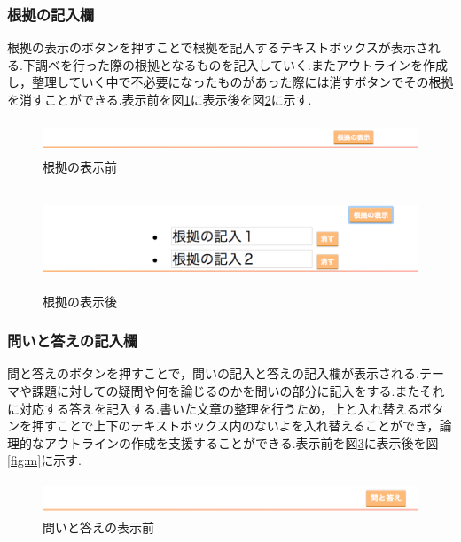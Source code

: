 \documentclass[a4j,12pt]{jarticle}
\begin{document}
\newpage
\subsubsection{根拠の記入欄}
根拠の表示のボタンを押すことで根拠を記入するテキストボックスが表示される.下調べを行った際の根拠となるものを記入していく.またアウトラインを作成し，整理していく中で不必要になったものがあった際には消すボタンでその根拠を消すことができる.表示前を図\ref{fig:j}に表示後を図\ref{fig:k}に示す.
\begin{figure}[h]
\begin{center}
 \includegraphics[clip,width=150mm,height=10mm]{figure/02konkyo.png}
\end{center}
 \caption{根拠の表示前}
 \label{fig:j}
\end{figure}

\begin{figure}[h]
\begin{center}
 \includegraphics[clip,width=150mm,height=30mm]{figure/03konkuo.png}
\end{center}
 \caption{根拠の表示後}
 \label{fig:k}
\end{figure}

\newpage
\subsubsection{問いと答えの記入欄}
問と答えのボタンを押すことで，問いの記入と答えの記入欄が表示される.テーマや課題に対しての疑問や何を論じるのかを問いの部分に記入をする.またそれに対応する答えを記入する.書いた文章の整理を行うため，上と入れ替えるボタンを押すことで上下のテキストボックス内のないよを入れ替えることができ，論理的なアウトラインの作成を支援することができる.表示前を図\ref{fig:l}に表示後を図\ref{fig:m}に示す.

\begin{figure}[h]
\begin{center}
 \includegraphics[clip,width=150mm,height=10mm]{figure/04qanda.png}
\end{center}
 \caption{問いと答えの表示前}
 \label{fig:l}
\end{figure}
\end{document}
